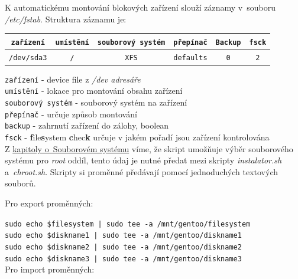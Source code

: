 \documentclass[12pt,a4paper,twoside,]{article}
\begin{document}
{{{{{{K automatickému montování blokových zařízení slouží záznamy v~souboru \textit{/etc/fstab}. Struktura záznamu je:

\begin{table}[h]
	\begin{tabular}{|c|c|c|c|c|c|}
		\hline
		\texttt{zařízení} & \texttt{umístění} & \texttt{souborový systém} & \texttt{přepínač} & \texttt{Backup} & \texttt{fsck} \\
		\hline
		\texttt{/dev/sda3} & \texttt{/} & \texttt{XFS} & \texttt{defaults} & \texttt{0} & \texttt{2} \\
		\hline
		
	\end{tabular}
\end{table}
\hspace*{-1.5em}\texttt{zařízení} - device file z \textit{/dev adresáře}\\
\texttt{umístění} - lokace pro montování obsahu zařízení \\
\texttt{souborový systém} - souborový systém na zařízení\\
\texttt{přepínač} - určuje způsob montování\\
\texttt{backup} - zahrnutí zařízení do zálohy, boolean\\
\texttt{fsck} - {\bf f}ile{\bf s}ystem {\bf c}hec{\bf k} určuje v jakém pořadí jsou zařízení kontrolována\\

Z \hyperlink{Souborový systém}{kapitoly o~Souborovém systému} víme, že skript umožňuje výběr souborového systému pro \textit{root} oddíl, tento údaj je nutné předat mezi skripty \textit{instalator.sh} a~\textit{chroot.sh}. Skripty si proměnné předávají pomocí jednoduchých textových souborů.

\hspace*{-1.5em}Pro export proměnných:

\texttt{sudo echo \$filesystem | sudo tee -a /mnt/gentoo/filesystem} \\
\hspace*{1.5em}\texttt{sudo echo \$diskname1 | sudo tee -a /mnt/gentoo/diskname1} \\
\hspace*{1.5em}\texttt{sudo echo \$diskname2 | sudo tee -a /mnt/gentoo/diskname2} \\
\hspace*{1.5em}\texttt{sudo echo \$diskname3 | sudo tee -a /mnt/gentoo/diskname3} \\

\hspace*{-1.5em}Pro import proměnných:

}}}}}}
\end{document}
